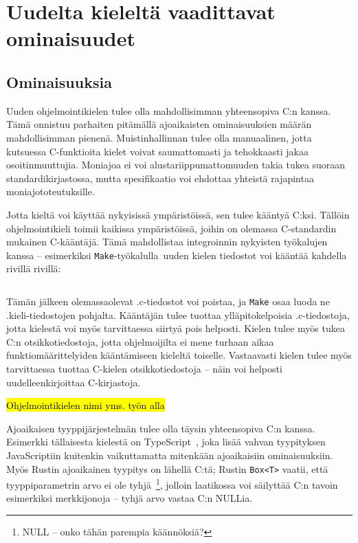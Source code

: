 \section{Uudelta kieleltä vaadittavat ominaisuudet}

\subsection{Ominaisuuksia}

Uuden ohjelmointikielen tulee olla mahdollisimman yhteensopiva C:n kanssa. Tämä
onnistuu parhaiten pitämällä ajoaikaisten ominaisuuksien määrän mahdollisimman
pienenä. Muistinhallinnan tulee olla manuaalinen, jotta kutsuessa C-funktioita
kielet voivat saumattomasti ja tehokkaasti jakaa osoitinmuuttujia. Moniajoa ei
voi alustariippumattomuuden takia tukea suoraan standardikirjastossa, mutta
spesifikaatio voi ehdottaa yhteistä rajapintaa moniajototeutuksille.

Jotta kieltä voi käyttää nykyisissä ympäristöissä, sen tulee kääntyä C:ksi.
Tällöin ohjelmointikieli toimii kaikissa ympäristöissä, joihin on olemassa
C-standardin mukainen C-kääntäjä. Tämä mahdollistaa integroinnin nykyisten
työkalujen kanssa -- esimerkiksi \texttt{Make}-työkalulla~\citationneeded uuden
kielen tiedostot voi kääntää kahdella rivillä rivillä:

\inputminted{make}{Makefile.kieli}

Tämän jälkeen olemassaolevat .c-tiedostot voi poistaa, ja \texttt{Make} osaa
luoda ne .kieli-tiedostojen pohjalta. Kääntäjän tulee tuottaa ylläpitokelpoisia
.c-tiedostoja, jotta kielestä voi myös tarvittaessa siirtyä pois helposti.
Kielen tulee myös tukea C:n otsikkotiedostoja, jotta ohjelmoijilta ei mene
turhaan aikaa funktiomäärittelyiden kääntämiseen kieleltä toiselle. Vastaavasti
kielen tulee myös tarvittaessa tuottaa C-kielen otsikkotiedostoja -- näin voi
helposti uudelleenkirjoittaa C-kirjastoja.

\hl{Ohjelmointikielen nimi yms. työn alla}

Ajoaikaisen tyyppijärjestelmän tulee olla täysin yhteensopiva C:n kanssa.
Esimerkki tällaisesta kielestä on TypeScript~\citationneeded, joka lisää vahvan
tyypityksen JavaScriptiin kuitenkin vaikuttamatta mitenkään ajoaikaisiin
ominaisuuksiin. Myös Rustin ajoaikainen tyypitys on lähellä C:tä; Rustin
\texttt{Box<T>} vaatii, että tyyppiparametrin arvo ei ole tyhjä~\footnote{NULL
-- onko tähän parempia käännöksiä?}, jolloin laatikossa voi säilyttää C:n
tavoin esimerkiksi merkkijonoja -- tyhjä arvo vastaa C:n NULLia.

